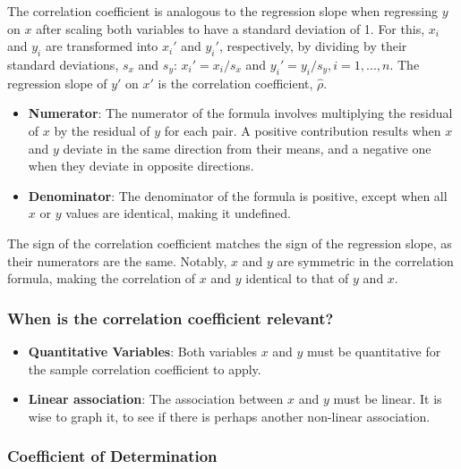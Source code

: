 \documentclass{article}
\begin{document}
The correlation coefficient is analogous to the regression slope when regressing $y$ on $x$ after scaling both variables to have a standard deviation of 1. For this, $x_i$ and $y_i$ are transformed into $x_i'$ and $y_i'$, respectively, by dividing by their standard deviations, $s_x$ and $s_y$: $x_i'=x_i/s_x$ and $y_i'=y_i/s_y, i=1,...,n$. The regression slope of $y'$ on $x'$ is the correlation coefficient, $\hat\rho$.

\begin{itemize}
    \item \textbf{Numerator}: The numerator of the formula involves multiplying the residual of $x$ by the residual of $y$ for each pair. A positive contribution results when $x$ and $y$ deviate in the same direction from their means, and a negative one when they deviate in opposite directions.

    \item \textbf{Denominator}: The denominator of the formula is positive, except when all $x$ or $y$ values are identical, making it undefined. 

\end{itemize}

The sign of the correlation coefficient matches the sign of the regression slope, as their numerators are the same. Notably, $x$ and $y$ are symmetric in the correlation formula, making the correlation of $x$ and $y$ identical to that of $y$ and $x$.

\subsubsection{When is the correlation coefficient relevant?}

\begin{itemize}
    \item \textbf{Quantitative Variables}: Both variables $x$ and $y$ must be quantitative for the sample correlation coefficient to apply.

    \item \textbf{Linear association}: The association between $x$ and $y$ must be linear. It is wise to graph it, to see if there is perhaps another non-linear association.

\end{itemize}

\subsubsection{Coefficient of Determination}
\end{document}
